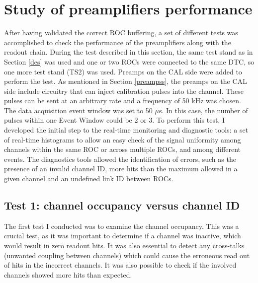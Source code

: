 \section{Study of preamplifiers performance}\label{dqm}
After having validated the correct ROC buffering, 
a set of different tests was accomplished to check 
the performance of the preamplifiers along with the readout chain.
During the test described in this section, the 
same test stand as in Section \ref{des} was 
used and one or two ROCs 
were connected to the same DTC, so one more 
test stand (TS2) was used. Preamps on the CAL 
side were added to perform the test.
As mentioned in Section \ref{preampss}, the 
preamps on the CAL side 
include circuitry that can inject calibration 
pulses into the channel. 
These pulses can be sent at an arbitrary rate and a frequency 
of 50 kHz was chosen. 
The data acquisition event window was set 
to 50 $\mu$s. 
In this case, the number of pulses within 
one Event Window could be 2 or 3.
To perform this test, I developed the initial step to the  
real-time monitoring and diagnostic tools: 
a set of real-time histograms to allow an 
easy check of the signal uniformity among 
channels within the same ROC or across 
multiple ROCs, and among different events.
The diagnostics tools allowed the identification 
of errors, such as the presence of an 
invalid channel ID, more hits than the maximum 
allowed in a given channel 
and an undefined link ID between ROCs.

\subsection{Test 1: channel occupancy versus channel ID}\label{nhitvschid}
The first test I conducted was to examine the channel occupancy. 
This was a crucial test, as it was important to determine if a 
channel was inactive, which would result in zero readout hits. 
It was also essential to detect any cross-talks (unwanted 
coupling between channels) which could cause the erroneous 
read out of hits in the incorrect channels.
It was also possible to check if the involved 
channels showed more hits than expected. 



